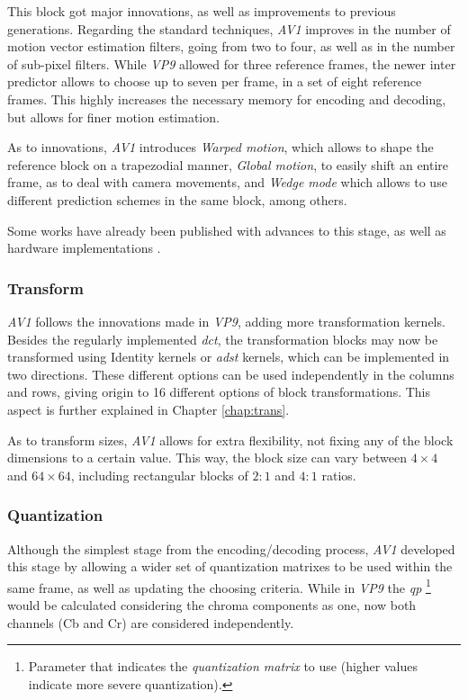 This block got major innovations, as well as improvements to previous generations. Regarding the standard techniques, \emph{AV1} improves in the number of motion vector estimation filters, going from two to four, as well as in the number of sub-pixel filters. While \emph{VP9} allowed for three reference frames, the newer inter predictor allows to choose up to seven per frame, in a set of eight reference frames. This highly increases the necessary memory for encoding and decoding, but allows for finer motion estimation.

As to innovations, \emph{AV1} introduces \emph{Warped motion}, which allows to shape the reference block on a trapezodial manner, \emph{Global motion}, to easily shift an entire frame, as to deal with camera movements, and \emph{Wedge mode} which allows to use different prediction schemes in the same block, among others.

Some works have already been published with advances to this stage, as well as hardware implementations \cite{dengHardwarefriendlyInterPrediction2017,domanskiHighThroughputMultifilterInterpolation2019}.

\subsubsection{Transform}

\emph{AV1} follows the innovations made in \emph{VP9}, adding more transformation kernels. Besides the regularly implemented \emph{\gls{dct}}, the transformation blocks may now be transformed using Identity kernels or \emph{\gls{adst}} kernels, which can be implemented in two directions. These different options can be used independently in the columns and rows, giving origin to 16 different options of block transformations. This aspect is further explained in Chapter \ref{chap:trans}.

As to transform sizes, \emph{AV1} allows for extra flexibility, not fixing any of the block dimensions to a certain value. This way, the block size can vary between $4 \times 4$ and $64 \times 64$, including rectangular blocks of $2:1$ and $4:1$ ratios.

\subsubsection{Quantization}

Although the simplest stage from the encoding/decoding process, \emph{AV1} developed this stage by allowing a wider set of quantization matrixes to be used within the same frame, as well as updating the choosing criteria. While in \emph{VP9} the \emph{\gls{qp}} 
\footnote{Parameter that indicates the \emph{quantization matrix} to use (higher values indicate more severe quantization).}
would be calculated considering the chroma components as one, now both channels (Cb and Cr) are considered independently.

